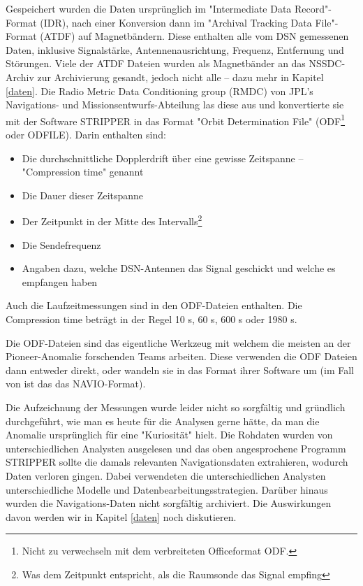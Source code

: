 Gespeichert wurden die Daten ursprünglich im "Intermediate Data Record"-Format (IDR), nach einer Konversion dann im "Archival Tracking Data File"-Format (ATDF) auf Magnetbändern. Diese enthalten alle vom DSN gemessenen Daten, inklusive Signalstärke, Antennenausrichtung, Frequenz, Entfernung und Störungen\cite{Turyshev2010}. %
Viele der ATDF Dateien wurden als Magnetbänder an das NSSDC-Archiv zur Archivierung gesandt, jedoch nicht alle – dazu mehr in Kapitel \ref{daten}\cite{Markwardt2002}.
Die Radio Metric Data Conditioning group (RMDC) von JPL's Navigations- und Missionsentwurfs-Abteilung las diese aus und konvertierte sie mit der Software STRIPPER in das Format "Orbit Determination File" (ODF\footnote{Nicht zu verwechseln mit dem verbreiteten Officeformat ODF.} oder ODFILE).
Darin enthalten sind\cite{Levy2008}:
\begin{itemize}
\item Die durchschnittliche Dopplerdrift über eine gewisse Zeitspanne – "Compression time" genannt
\item Die Dauer dieser Zeitspanne
\item Der Zeitpunkt in der Mitte des Intervalls\footnote{Was dem Zeitpunkt entspricht, als die Raumsonde das Signal empfing\cite{Levy2008}}
\item Die Sendefrequenz
\item Angaben dazu, welche DSN-Antennen das Signal geschickt und welche es empfangen haben
\end{itemize}
Auch die Laufzeitmessungen sind in den ODF-Dateien enthalten\cite{Anderson2002}.
Die Compression time beträgt in der Regel 10 s, 60 s, 600 s oder 1980 s\cite{Anderson2002}. %

Die ODF-Dateien sind das eigentliche Werkzeug mit welchem die meisten an der Pioneer-Anomalie forschenden Teams arbeiten. Diese verwenden die ODF Dateien dann entweder direkt, oder wandeln sie in das Format ihrer Software um (im Fall von \cite{Anderson2002} ist das das NAVIO-Format).

Die Aufzeichnung der Messungen wurde leider nicht so sorgfältig und gründ\-lich durchgeführt, wie man es heute für die Analysen gerne hätte, da man die Anomalie ursprünglich für eine "Kuriosität" hielt\cite{Nieto2005}.
Die Rohdaten wurden von unterschiedlichen Analysten ausgelesen und das oben angesprochene Programm STRIPPER sollte die damals relevanten Navigationsdaten extrahieren\cite{Nieto2005}, wodurch Daten verloren gingen. %
Dabei verwendeten die unterschiedlichen Analysten unterschiedliche Modelle und Datenbearbeitungsstrategien\cite{Nieto2005}.
Darüber hinaus wurden die Navigations-Daten nicht sorgfältig archiviert\cite{Nieto2005}.
Die Auswirkungen davon werden wir in Kapitel \ref{daten} noch diskutieren.


